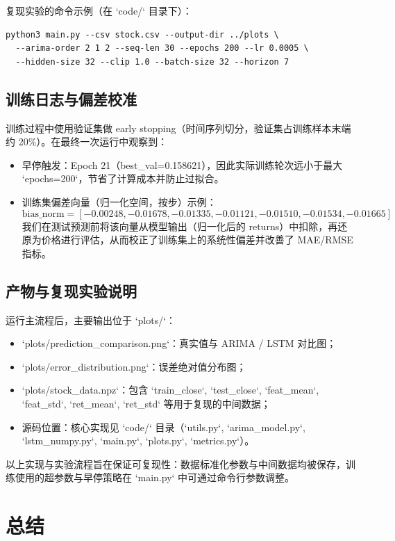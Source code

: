 复现实验的命令示例（在 `code/` 目录下）：
\begin{verbatim}
python3 main.py --csv stock.csv --output-dir ../plots \
  --arima-order 2 1 2 --seq-len 30 --epochs 200 --lr 0.0005 \
  --hidden-size 32 --clip 1.0 --batch-size 32 --horizon 7
\end{verbatim}

\section{训练日志与偏差校准}
训练过程中使用验证集做 early stopping（时间序列切分，验证集占训练样本末端约 20\%）。在最终一次运行中观察到：
\begin{itemize}
    \item 早停触发：Epoch 21（best\_val=0.158621），因此实际训练轮次远小于最大 `epochs=200`，节省了计算成本并防止过拟合。
    \item 训练集偏差向量（归一化空间，按步）示例：
    \[\text{bias\_norm} = [ -0.00248, -0.01678, -0.01335, -0.01121, -0.01510, -0.01534, -0.01665 ]\]
    我们在测试预测前将该向量从模型输出（归一化后的 returns）中扣除，再还原为价格进行评估，从而校正了训练集上的系统性偏差并改善了 MAE/RMSE 指标。
\end{itemize}

\section{产物与复现实验说明}
运行主流程后，主要输出位于 `plots/`：
\begin{itemize}
    \item `plots/prediction\_comparison.png`：真实值与 ARIMA / LSTM 对比图；
    \item `plots/error\_distribution.png`：误差绝对值分布图；
    \item `plots/stock\_data.npz`：包含 `train\_close`, `test\_close`, `feat\_mean`, `feat\_std`, `ret\_mean`, `ret\_std` 等用于复现的中间数据；
    \item 源码位置：核心实现见 `code/` 目录（`utils.py`, `arima\_model.py`, `lstm\_numpy.py`, `main.py`, `plots.py`, `metrics.py`）。
\end{itemize}

以上实现与实验流程旨在保证可复现性：数据标准化参数与中间数据均被保存，训练使用的超参数与早停策略在 `main.py` 中可通过命令行参数调整。

\chapter{总结}
